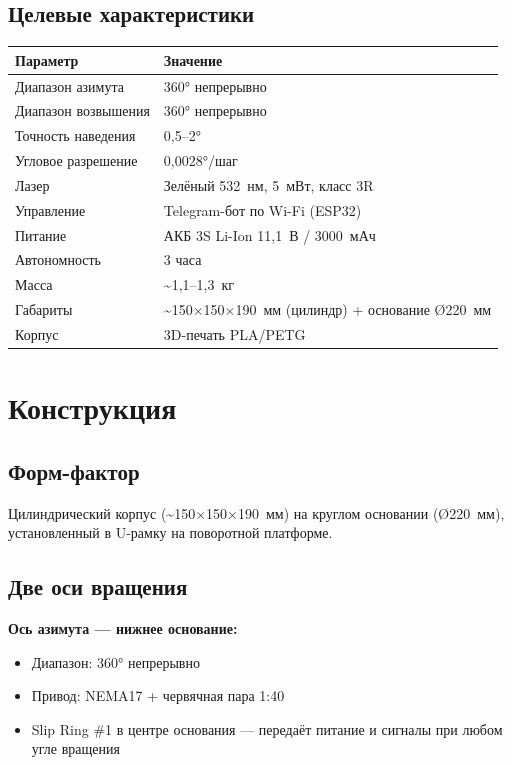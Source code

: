 \documentclass[12pt, a4paper]{article}
\begin{document}
\subsection*{Целевые характеристики}

\begin{tabularx}{\textwidth}{|X|X|}
\hline
\textbf{Параметр} & \textbf{Значение} \\
\hline
Диапазон азимута & 360° непрерывно \\
\hline
Диапазон возвышения & 360° непрерывно \\
\hline
Точность наведения & 0{,}5--2°  \\
\hline
Угловое разрешение & 0{,}0028°/шаг \\
\hline
Лазер & Зелёный 532~нм, 5~мВт, класс 3R \\
\hline
Управление & Telegram-бот по Wi-Fi (ESP32) \\
\hline
Питание & АКБ 3S Li-Ion 11{,}1~В / 3000~мАч \\
\hline
Автономность & 3 часа \\
\hline
Масса & {\textasciitilde}1{,}1--1{,}3~кг \\
\hline
Габариты & {\textasciitilde}150$\times$150$\times$190~мм (цилиндр) + основание Ø220~мм \\
\hline
Корпус & 3D-печать PLA/PETG \\
\hline
\end{tabularx}

\section*{Конструкция}

\subsection*{Форм-фактор}

Цилиндрический корпус ({\textasciitilde}150$\times$150$\times$190~мм) на круглом основании (Ø220~мм), установленный в U-рамку на поворотной платформе.

\subsection*{Две оси вращения}

\textbf{Ось азимута --- нижнее основание:}
\begin{itemize}[leftmargin=*, nosep]
    \item Диапазон: 360° непрерывно
    \item Привод: NEMA17 + червячная пара 1:40
    \item Slip Ring \#1 в центре основания --- передаёт питание и сигналы при любом угле вращения
\end{itemize}
\end{document}
